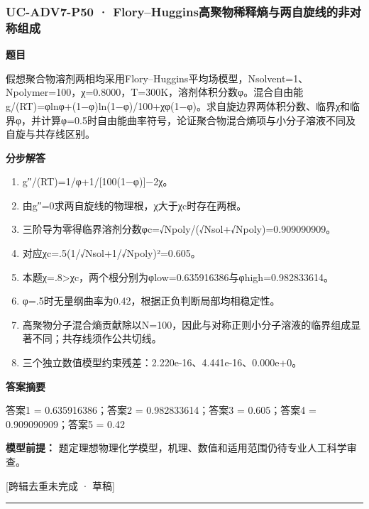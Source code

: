 \documentclass[UTF8,11pt,a4paper]{ctexart}
\begin{document}
\subsubsection*{UC-ADV7-P50 · Flory–Huggins高聚物稀释熵与两自旋线的非对称组成}
\noindent\textbf{题目}\par
假想聚合物溶剂两相均采用Flory–Huggins平均场模型，Nsolvent=1、Npolymer=100，χ=0.8000，T=300K，溶剂体积分数φ。混合自由能g/(RT)=φlnφ+(1−φ)ln(1−φ)/100+χφ(1−φ)。求自旋边界两体积分数、临界χ和临界φ，并计算φ=0.5时自由能曲率符号，论证聚合物混合熵项与小分子溶液不同及自旋与共存线区别。\par
\medskip\noindent\textbf{分步解答}
\begin{enumerate}
\item g″/(RT)=1/φ+1/[100(1−φ)]−2χ。
\item 由g″=0求两自旋线的物理根，χ大于χc时存在两根。
\item 三阶导为零得临界溶剂分数φc=√Npoly/(√Nsol+√Npoly)=0.909090909。
\item 对应χc=.5(1/√Nsol+1/√Npoly)²=0.605。
\item 本题χ=.8>χc，两个根分别为φlow=0.635916386与φhigh=0.982833614。
\item φ=.5时无量纲曲率为0.42，根据正负判断局部均相稳定性。
\item 高聚物分子混合熵贡献除以N=100，因此与对称正则小分子溶液的临界组成显著不同；共存线须作公共切线。
\item 三个独立数值模型约束残差：2.220e-16、4.441e-16、0.000e+0。
\end{enumerate}
\noindent\textbf{答案摘要}\par
答案1 = 0.635916386；答案2 = 0.982833614；答案3 = 0.605；答案4 = 0.909090909；答案5 = 0.42\par
\noindent\textbf{模型前提：}
题定理想物理化学模型，机理、数值和适用范围仍待专业人工科学审查。\par
\noindent\textcolor{red!65!black}{[跨辑去重未完成 · 草稿]} \par
\medskip\hrule\medskip
{}
\end{document}
